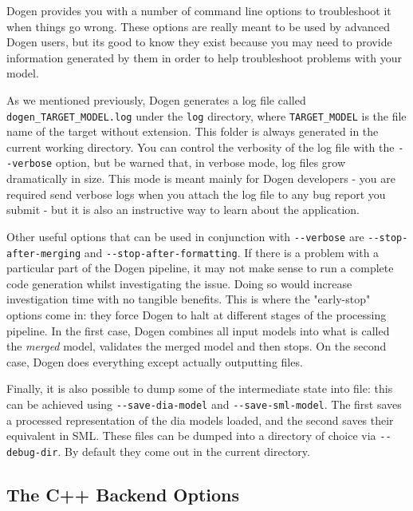 \documentclass[11pt]{article}
\begin{document}
Dogen provides you with a number of command line options to
troubleshoot it when things go wrong. These options are really meant
to be used by advanced Dogen users, but its good to know they exist
because you may need to provide information generated by them in order
to help troubleshoot problems with your model.

As we mentioned previously, Dogen generates a log file called
\texttt{dogen\_TARGET\_MODEL.log} under the \texttt{log} directory, where
\texttt{TARGET\_MODEL} is the file name of the target without extension. This
folder is always generated in the current working directory. You can
control the verbosity of the log file with the \texttt{-{}-verbose} option, but
be warned that, in verbose mode, log files grow dramatically in
size. This mode is meant mainly for Dogen developers - you are
required send verbose logs when you attach the log file to any bug
report you submit - but it is also an instructive way to learn about
the application.

Other useful options that can be used in conjunction with \texttt{-{}-verbose}
are \texttt{-{}-stop-after-merging} and \texttt{-{}-stop-after-formatting}. If there is
a problem with a particular part of the Dogen pipeline, it may not
make sense to run a complete code generation whilst investigating the
issue. Doing so would increase investigation time with no tangible
benefits. This is where the "early-stop" options come in: they force
Dogen to halt at different stages of the processing pipeline. In the
first case, Dogen combines all input models into what is called the
\emph{merged} model, validates the merged model and then stops. On the
second case, Dogen does everything except actually outputting files.

Finally, it is also possible to dump some of the intermediate state
into file: this can be achieved using \texttt{-{}-save-dia-model} and
\texttt{-{}-save-sml-model}. The first saves a processed representation of the
dia models loaded, and the second saves their equivalent in SML. These
files can be dumped into a directory of choice via \texttt{-{}-debug-dir}. By
default they come out in the current directory.

\subsection{The C++ Backend Options}
\label{sec-3-3}
\end{document}
